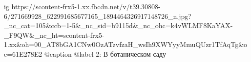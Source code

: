  
 
 
 
 

\ifcmt
  ig https://scontent-frx5-1.xx.fbcdn.net/v/t39.30808-6/271669928_622991685677165_1894464326917148726_n.jpg?_nc_cat=105&ccb=1-5&_nc_sid=b9115d&_nc_ohc=k4vWLMF8KaYAX-_F9QW&_nc_ht=scontent-frx5-1.xx&oh=00_AT8bGA1CNw0OzATzvfzaH_wsIh9XWYyyMmuQUzr1TfAqTg&oe=61E278E2
  @caption @label 2: В ботаническом саду
\fi
